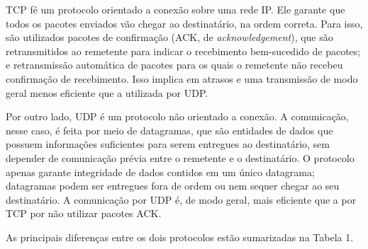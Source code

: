 \documentclass[a4paper,10pt]{article}
\begin{document}
TCP fé um protocolo orientado a conexão sobre uma rede IP. Ele garante que todos os pacotes enviados vão chegar ao destinatário, na ordem correta. Para isso, são utilizados pacotes de confirmação (ACK, de \textit{acknowledgement}), que são retransmitidos ao remetente para indicar o recebimento bem-sucedido de pacotes; e retransmissão automática de pacotes para os quais o remetente não recebeu confirmação de recebimento. Isso implica em atrasos e uma transmissão de modo geral menos eficiente que a utilizada por UDP.

Por outro lado, UDP é um protocolo não orientado a conexão. A comunicação, nesse caso, é feita por meio de datagramas, que são entidades de dados que possuem informações suficientes para serem entregues ao destinatário, sem depender de comunicação prévia entre o remetente e o destinatário. O protocolo apenas garante integridade de dados contidos em um único datagrama; datagramas podem ser entregues fora de ordem ou nem sequer chegar ao seu destinatário. A comunicação por UDP é, de modo geral, mais eficiente que a por TCP por não utilizar pacotes ACK. 

As principais diferenças entre os dois protocolos estão sumarizadas na Tabela 1.
\end{document}
